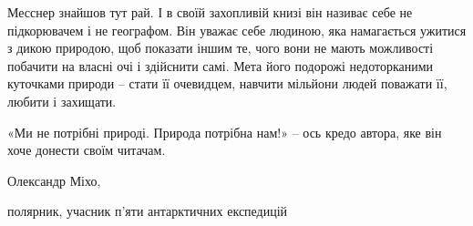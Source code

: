 Месснер знайшов тут рай. І в своїй захопливій книзі він називає себе не
підкорювачем і не географом. Він уважає себе людиною, яка намагається ужитися з
дикою природою, щоб показати іншим те, чого вони не мають можливості побачити
на власні очі і здійснити самі. Мета його подорожі недоторканими куточками
природи – стати її очевидцем, навчити мільйони людей поважати її, любити і
захищати.

«Ми не потрібні природі. Природа потрібна нам!» – ось кредо автора, яке він
хоче донести своїм читачам. 

Олександр Міхо,

полярник, учасник п’яти антарктичних експедицій
